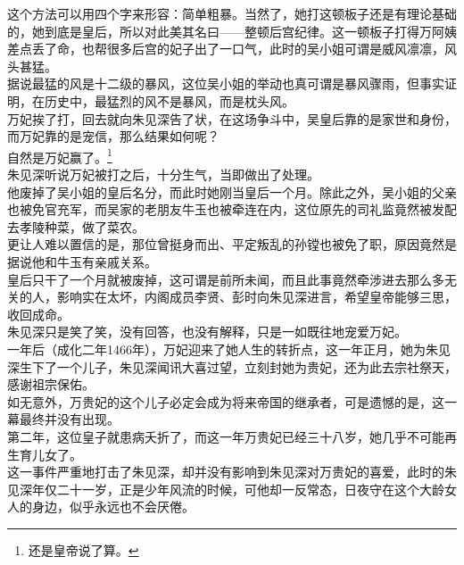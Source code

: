 \begin{multicols}{\theparacolNo}
这个方法可以用四个字来形容：简单粗暴。当然了，她打这顿板子还是有理论基础的，她到底是皇后，所以对此美其名曰——整顿后宫纪律。这一顿板子打得万阿姨差点丢了命，也帮很多后宫的妃子出了一口气，此时的吴小姐可谓是威风凛凛，风头甚猛。\\

据说最猛的风是十二级的暴风，这位吴小姐的举动也真可谓是暴风骤雨，但事实证明，在历史中，最猛烈的风不是暴风，而是枕头风。\\

万妃挨了打，回去就向朱见深告了状，在这场争斗中，吴皇后靠的是家世和身份，而万妃靠的是宠信，那么结果如何呢？\\

自然是万妃赢了。\footnote{还是皇帝说了算。}\\

朱见深听说万妃被打之后，十分生气，当即做出了处理。\\

他废掉了吴小姐的皇后名分，而此时她刚当皇后一个月。除此之外，吴小姐的父亲也被免官充军，而吴家的老朋友牛玉也被牵连在内，这位原先的司礼监竟然被发配去孝陵种菜，做了菜农。\\

更让人难以置信的是，那位曾挺身而出、平定叛乱的孙镗也被免了职，原因竟然是据说他和牛玉有亲戚关系。\\

皇后只干了一个月就被废掉，这可谓是前所未闻，而且此事竟然牵涉进去那么多无关的人，影响实在太坏，内阁成员李贤、彭时向朱见深进言，希望皇帝能够三思，收回成命。\\

朱见深只是笑了笑，没有回答，也没有解释，只是一如既往地宠爱万妃。\\

一年后（成化二年1466年），万妃迎来了她人生的转折点，这一年正月，她为朱见深生下了一个儿子，朱见深闻讯大喜过望，立刻封她为贵妃，还为此去宗社祭天，感谢祖宗保佑。\\

如无意外，万贵妃的这个儿子必定会成为将来帝国的继承者，可是遗憾的是，这一幕最终并没有出现。\\

第二年，这位皇子就患病夭折了，而这一年万贵妃已经三十八岁，她几乎不可能再生育儿女了。\\

这一事件严重地打击了朱见深，却并没有影响到朱见深对万贵妃的喜爱，此时的朱见深年仅二十一岁，正是少年风流的时候，可他却一反常态，日夜守在这个大龄女人的身边，似乎永远也不会厌倦。\\


\end{multicols}
